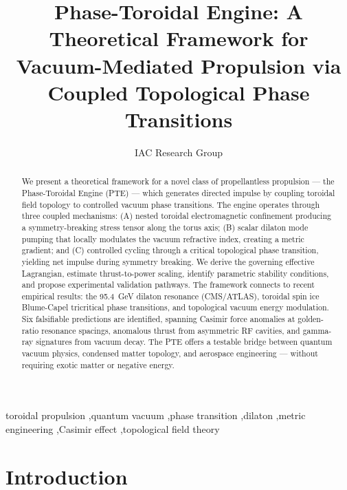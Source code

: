\documentclass[preprint,12pt]{elsarticle}
\begin{document}
\begin{frontmatter}

\title{Phase-Toroidal Engine: A Theoretical Framework for Vacuum-Mediated Propulsion via Coupled Topological Phase Transitions}

\author{IAC Research Group}

\address{Independent Research}

\begin{abstract}
We present a theoretical framework for a novel class of propellantless propulsion --- the Phase-Toroidal Engine (PTE) --- which generates directed impulse by coupling toroidal field topology to controlled vacuum phase transitions. The engine operates through three coupled mechanisms: (A) nested toroidal electromagnetic confinement producing a symmetry-breaking stress tensor along the torus axis; (B) scalar dilaton mode pumping that locally modulates the vacuum refractive index, creating a metric gradient; and (C) controlled cycling through a critical topological phase transition, yielding net impulse during symmetry breaking. We derive the governing effective Lagrangian, estimate thrust-to-power scaling, identify parametric stability conditions, and propose experimental validation pathways. The framework connects to recent empirical results: the 95.4~GeV dilaton resonance (CMS/ATLAS), toroidal spin ice Blume-Capel tricritical phase transitions, and topological vacuum energy modulation. Six falsifiable predictions are identified, spanning Casimir force anomalies at golden-ratio resonance spacings, anomalous thrust from asymmetric RF cavities, and gamma-ray signatures from vacuum decay. The PTE offers a testable bridge between quantum vacuum physics, condensed matter topology, and aerospace engineering --- without requiring exotic matter or negative energy.
\end{abstract}

\begin{keyword}
toroidal propulsion \sep quantum vacuum \sep phase transition \sep dilaton \sep metric engineering \sep Casimir effect \sep topological field theory
\end{keyword}

\end{frontmatter}

\section{Introduction}
\label{sec:intro}
\end{document}
